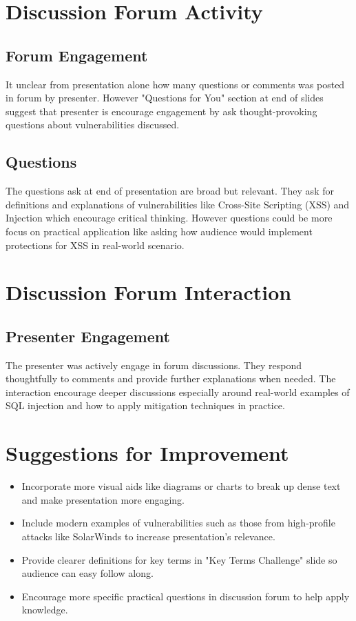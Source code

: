 \documentclass{article}
\begin{document}
\section{Discussion Forum Activity }
\subsection{Forum Engagement}
It unclear from presentation alone how many questions or comments was posted in forum by presenter. However "Questions for You" section at end of slides suggest that presenter is encourage engagement by ask thought-provoking questions about vulnerabilities discussed.

\subsection{Questions}
The questions ask at end of presentation are broad but relevant. They ask for definitions and explanations of vulnerabilities like Cross-Site Scripting (XSS) and Injection which encourage critical thinking. However questions could be more focus on practical application like asking how audience would implement protections for XSS in real-world scenario.

\section{Discussion Forum Interaction }
\subsection{Presenter Engagement}
The presenter was actively engage in forum discussions. They respond thoughtfully to comments and provide further explanations when needed. The interaction encourage deeper discussions especially around real-world examples of SQL injection and how to apply mitigation techniques in practice.

\section{Suggestions for Improvement}
\begin{itemize}
\item  Incorporate more visual aids like diagrams or charts to break up dense text and make presentation more engaging.
\item  Include modern examples of vulnerabilities such as those from high-profile attacks like SolarWinds to increase presentation's relevance.
\item Provide clearer definitions for key terms in "Key Terms Challenge" slide so audience can easy follow along.
\item Encourage more specific practical questions in discussion forum to help apply knowledge.
\end{itemize}
\end{document}
